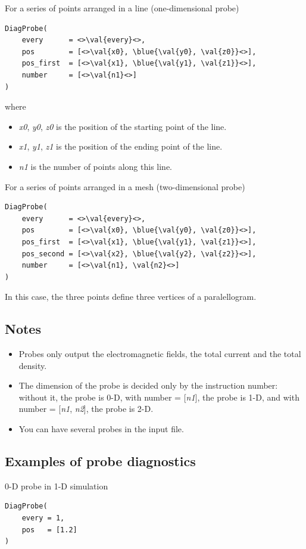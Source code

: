 \documentclass[11pt]{article}
\newcommand{\code}[1]{\colorbox{yellow!15}{\ttfamily #1}}
\newcommand{\val}[1]{{\ttfamily \textit{#1}}}
\newcommand{\blue}[1]{{\color{blue} #1}}
\begin{document}
For a series of points arranged in a line (one-dimensional probe)
\begin{lstlisting}
DiagProbe(
    every      = <>\val{every}<>,
    pos        = [<>\val{x0}, \blue{\val{y0}, \val{z0}}<>],
    pos_first  = [<>\val{x1}, \blue{\val{y1}, \val{z1}}<>],
    number     = [<>\val{n1}<>]
)
\end{lstlisting}
where
\begin{itemize}
\item \val{x0}, \val{y0}, \val{z0} is the position of the starting point of the line.
\item \val{x1}, \val{y1}, \val{z1} is the position of the ending point of the line.
\item \val{n1} is the number of points along this line.
\end{itemize}

For a series of points arranged in a mesh (two-dimensional probe)
\begin{lstlisting}
DiagProbe(
    every      = <>\val{every}<>,
    pos        = [<>\val{x0}, \blue{\val{y0}, \val{z0}}<>],
    pos_first  = [<>\val{x1}, \blue{\val{y1}, \val{z1}}<>],
    pos_second = [<>\val{x2}, \blue{\val{y2}, \val{z2}}<>],
    number     = [<>\val{n1}, \val{n2}<>]
)
\end{lstlisting}
In this case, the three points define three vertices of a paralellogram.

\subsection*{Notes}
\begin{itemize}
\item Probes only output the electromagnetic fields, the total current and the total density.
\item The dimension of the probe is decided only by the instruction \code{number}: without it, the probe is 0-D, with \code{number = [\val{n1}]}, the probe is 1-D, and with \code{number =  [\val{n1}, \val{n2}]}, the probe is 2-D.
\item You can have several probes in the input file.
\end{itemize}


\subsection*{Examples of probe diagnostics}

0-D probe in 1-D simulation
\begin{lstlisting}
DiagProbe(
    every = 1,
    pos   = [1.2]
)
\end{lstlisting}
\end{document}
